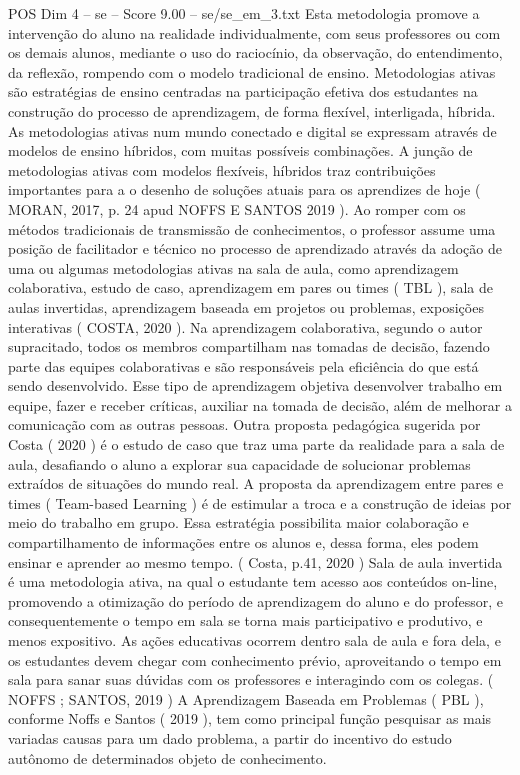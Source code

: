 \begin{textsample}{POS Dim 4 – se – Score 9.00 – se/se\_em\_3.txt}
Esta metodologia promove a intervenção do aluno na realidade individualmente, com seus professores ou com os demais alunos, mediante o uso do raciocínio, da observação, do entendimento, da reflexão, rompendo com o modelo tradicional de ensino.
Metodologias ativas são estratégias de ensino centradas na participação efetiva dos estudantes na construção do processo de aprendizagem, de forma flexível, interligada, híbrida.
As metodologias ativas num mundo conectado e digital se expressam através de modelos de ensino híbridos, com muitas possíveis combinações.
A junção de metodologias ativas com modelos flexíveis, híbridos traz contribuições importantes para a o desenho de soluções atuais para os aprendizes de hoje ( MORAN, 2017, p. 24 apud NOFFS E SANTOS 2019 ).
Ao romper com os métodos tradicionais de transmissão de conhecimentos, o professor assume uma posição de facilitador e técnico no processo de aprendizado através da adoção de uma ou algumas metodologias ativas na sala de aula, como aprendizagem colaborativa, estudo de caso, aprendizagem em pares ou times ( TBL ), sala de aulas invertidas, aprendizagem baseada em projetos ou problemas, exposições interativas ( COSTA, 2020 ).
Na aprendizagem colaborativa, segundo o autor supracitado, todos os membros compartilham nas tomadas de decisão, fazendo parte das equipes colaborativas e são responsáveis pela eficiência do que está sendo desenvolvido.
Esse tipo de aprendizagem objetiva desenvolver trabalho em equipe, fazer e receber críticas, auxiliar na tomada de decisão, além de melhorar a comunicação com as outras pessoas.
Outra proposta pedagógica sugerida por Costa ( 2020 ) é o estudo de caso que traz uma parte da realidade para a sala de aula, desafiando o aluno a explorar sua capacidade de solucionar problemas extraídos de situações do mundo real.
A proposta da aprendizagem entre pares e times ( Team-based Learning ) é de estimular a troca e a construção de ideias por meio do trabalho em grupo.
Essa estratégia possibilita maior colaboração e compartilhamento de informações entre os alunos e, dessa forma, eles podem ensinar e aprender ao mesmo tempo. ( Costa, p.41, 2020 ) Sala de aula invertida é uma metodologia ativa, na qual o estudante tem acesso aos conteúdos on-line, promovendo a otimização do período de aprendizagem do aluno e do professor, e consequentemente o tempo em sala se torna mais participativo e produtivo, e menos expositivo.
As ações educativas ocorrem dentro sala de aula e fora dela, e os estudantes devem chegar com conhecimento prévio, aproveitando o tempo em sala para sanar suas dúvidas com os professores e interagindo com os colegas. ( NOFFS ; SANTOS, 2019 ) A Aprendizagem Baseada em Problemas ( PBL ), conforme Noffs e Santos ( 2019 ), tem como principal função pesquisar as mais variadas causas para um dado problema, a partir do incentivo do estudo autônomo de determinados objeto de conhecimento.

\end{textsample}
